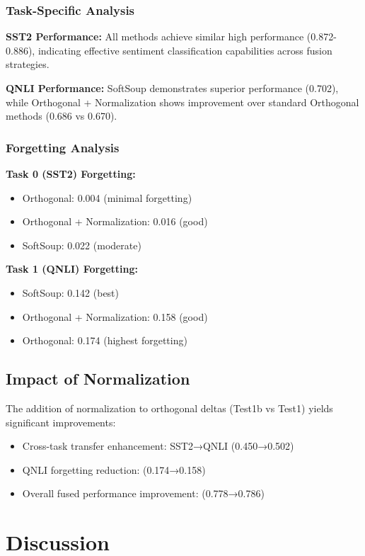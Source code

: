 \documentclass[11pt,a4paper]{article}
\begin{document}
\subsubsection{Task-Specific Analysis}

\textbf{SST2 Performance:} All methods achieve similar high performance (0.872-0.886), indicating effective sentiment classification capabilities across fusion strategies.

\textbf{QNLI Performance:} SoftSoup demonstrates superior performance (0.702), while Orthogonal + Normalization shows improvement over standard Orthogonal methods (0.686 vs 0.670).

\subsubsection{Forgetting Analysis}

\textbf{Task 0 (SST2) Forgetting:}
\begin{itemize}
    \item Orthogonal: 0.004 (minimal forgetting)
    \item Orthogonal + Normalization: 0.016 (good)
    \item SoftSoup: 0.022 (moderate)
\end{itemize}

\textbf{Task 1 (QNLI) Forgetting:}
\begin{itemize}
    \item SoftSoup: 0.142 (best)
    \item Orthogonal + Normalization: 0.158 (good)
    \item Orthogonal: 0.174 (highest forgetting)
\end{itemize}

\subsection{Impact of Normalization}

The addition of normalization to orthogonal deltas (Test1b vs Test1) yields significant improvements:
\begin{itemize}
    \item Cross-task transfer enhancement: SST2→QNLI (0.450→0.502)
    \item QNLI forgetting reduction: (0.174→0.158)
    \item Overall fused performance improvement: (0.778→0.786)
\end{itemize}

\section{Discussion}
\end{document}
